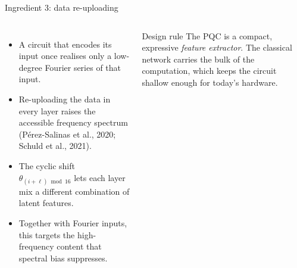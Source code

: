 \documentclass[aspectratio=169]{beamer}
\begin{document}
\begin{frame}{Ingredient 3: data re-uploading}
\begin{columns}[T,onlytextwidth]
\begin{itemize}
  \item A circuit that encodes its input once realises only a low-degree Fourier series of that input.
  \item Re-uploading the data in every layer raises the accessible frequency spectrum (P\'erez-Salinas et al., 2020; Schuld et al., 2021).
  \item The cyclic shift $\theta_{(i+\ell)\bmod16}$ lets each layer mix a different combination of latent features.
  \item Together with Fourier inputs, this targets the high-frequency content that spectral bias suppresses.
\end{itemize}
\begin{exampleblock}{Design rule}
The PQC is a compact, expressive \emph{feature extractor}. The classical network carries the bulk of the computation, which keeps the circuit shallow enough for today's hardware.
\end{exampleblock}
\end{columns}
\end{frame}
\end{document}
